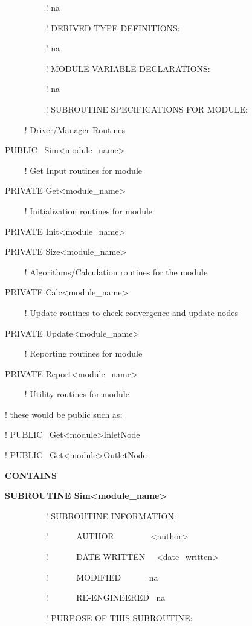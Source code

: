 ~~~~~~~~~ ! na

~~~~~~~~~ ! DERIVED TYPE DEFINITIONS:

~~~~~~~~~ ! na

~~~~~~~~~ ! MODULE VARIABLE DECLARATIONS:

~~~~~~~~~ ! na

~~~~~~~~~ ! SUBROUTINE SPECIFICATIONS FOR MODULE:

~~~~ ! Driver/Manager Routines

PUBLIC~ Sim\textless{}module\_name\textgreater{}

~~~~ ! Get Input routines for module

PRIVATE Get\textless{}module\_name\textgreater{}

~~~~ ! Initialization routines for module

PRIVATE Init\textless{}module\_name\textgreater{}

PRIVATE Size\textless{}module\_name\textgreater{}

~~~~ ! Algorithms/Calculation routines for the module

PRIVATE Calc\textless{}module\_name\textgreater{}

~~~~ ! Update routines to check convergence and update nodes

PRIVATE Update\textless{}module\_name\textgreater{}

~~~~ ! Reporting routines for module

PRIVATE Report\textless{}module\_name\textgreater{}

~~~~ ! Utility routines for module

! these would be public such as:

! PUBLIC~ Get\textless{}module\textgreater{}InletNode

! PUBLIC~ Get\textless{}module\textgreater{}OutletNode

\textbf{CONTAINS}

\textbf{SUBROUTINE Sim\textless{}module\_name\textgreater{}}

~~~~~~~~~ ! SUBROUTINE INFORMATION:

~~~~~~~~~ !~~~~~~ AUTHOR~~~~~~~~ \textless{}author\textgreater{}

~~~~~~~~~ !~~~~~~ DATE WRITTEN~~ \textless{}date\_written\textgreater{}

~~~~~~~~~ !~~~~~~ MODIFIED~~~~~~ na

~~~~~~~~~ !~~~~~~ RE-ENGINEERED~ na

~~~~~~~~~ ! PURPOSE OF THIS SUBROUTINE:

